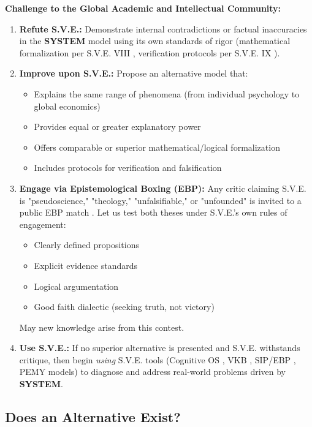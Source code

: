 \documentclass[11pt,a4paper]{article}
\newcommand{\SYSTEM}{\textbf{SYSTEM}}
\theoremstyle{definition}
\theoremstyle{remark}
\begin{document}
\begin{mdframed}[linecolor=svered, linewidth=2pt, backgroundcolor=gray!5]
\textbf{Challenge to the Global Academic and Intellectual Community:}

\begin{enumerate}
\item \textbf{Refute S.V.E.:} Demonstrate internal contradictions or factual inaccuracies in the \SYSTEM{} model using its own standards of rigor (mathematical formalization per S.V.E. VIII \cite{sve8}, verification protocols per S.V.E. IX \cite{sve9}).

\item \textbf{Improve upon S.V.E.:} Propose an alternative model that:
\begin{itemize}
\item Explains the same range of phenomena (from individual psychology to global economics)
\item Provides equal or greater explanatory power
\item Offers comparable or superior mathematical/logical formalization
\item Includes protocols for verification and falsification
\end{itemize}

\item \textbf{Engage via Epistemological Boxing (EBP):} Any critic claiming S.V.E. is "pseudoscience," "theology," "unfalsifiable," or "unfounded" is invited to a public EBP match \cite{sve0}. Let us test both theses under S.V.E.'s own rules of engagement:
\begin{itemize}
\item Clearly defined propositions
\item Explicit evidence standards
\item Logical argumentation
\item Good faith dialectic (seeking truth, not victory)
\end{itemize}
May new knowledge arise from this contest.

\item \textbf{Use S.V.E.:} If no superior alternative is presented and S.V.E. withstands critique, then begin \textit{using} S.V.E. tools (Cognitive OS \cite{sve10}, VKB \cite{sve11}, SIP/EBP \cite{sve0}, PEMY models) to diagnose and address real-world problems driven by \SYSTEM{}.
\end{enumerate}
\end{mdframed}

\subsection{Does an Alternative Exist?}
\end{document}
